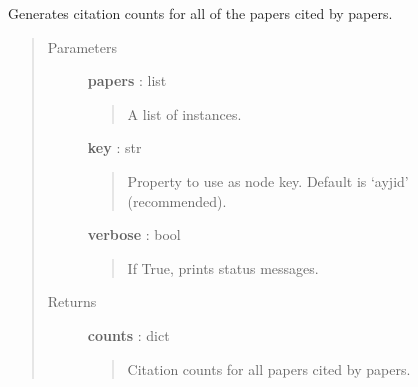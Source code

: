 \documentclass[letterpaper,10pt,english]{sphinxmanual}
\begin{document}
\begin{fulllineitems}
\label{tethne.networks.helpers:tethne.networks.helpers.citation_count}
Generates citation counts for all of the papers cited by papers.
\begin{quote}\begin{description}
\item[{Parameters}] \leavevmode
\textbf{papers} : list
\begin{quote}

A list of {\hyperref[tethne.classes.paper:tethne.classes.paper.Paper]{}} instances.
\end{quote}

\textbf{key} : str
\begin{quote}

Property to use as node key. Default is `ayjid' (recommended).
\end{quote}

\textbf{verbose} : bool
\begin{quote}

If True, prints status messages.
\end{quote}

\item[{Returns}] \leavevmode
\textbf{counts} : dict
\begin{quote}

Citation counts for all papers cited by papers.
\end{quote}

\end{description}\end{quote}

\end{fulllineitems}

\end{document}
